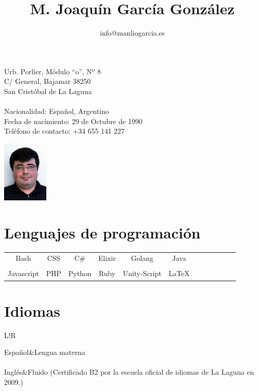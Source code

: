 \documentclass[10pt]{article}
\title{\bfseries M. Joaquín García González}
\author{info@manliogarcia.es}
\date{}
\newcommand\VRule{\color{lightgray}\vrule width 0.5pt}
\begin{document}

    \maketitle

    \begin{minipage}[ht]{0.48\textwidth}
        Urb. Porlier, Módulo ``o'', Nº 8\\
        C/ General, Bajamar 38250\\
        San Cristóbal de La Laguna\\
        \\
        Nacionalidad: Español, Argentino\\
        Fecha de nacimiento: 29 de Octubre de 1990\\
        Teléfono de contacto: +34 655 141 227
    \end{minipage}
    \begin{minipage}[ht]{0.48\textwidth}
        \begin{flushright}
        \includegraphics[height=8em]{profile}
        \end{flushright}
    \end{minipage}

    \section*{Lenguajes de programación}
    \begin{center}
    \begin{tabular}{ c c c c c c c c c c c c }

        Bash & CSS & C\# & Elixir & Golang & Java \\\\

        Javascript & PHP & Python & Ruby & Unity-Script & \LaTeX

    \end{tabular}
    \end{center}

    \section*{Idiomas}
    \begin{tabular}{L!{\VRule}R}

        Español&Lengua materna\\\\

        Inglés&Fluido (Certificado B2 por la escuela oficial de idiomas de La Laguna en 2009.)\\\\

    \end{tabular}
\end{document}
